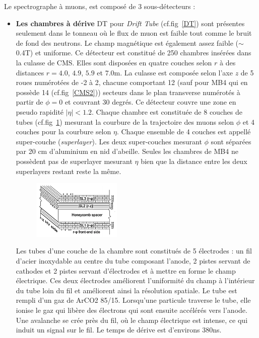 Le spectrographe à muons, est composé de 3 sous-détecteurs :
\begin{itemize}[label=$\bullet$]
	\item \textbf{Les chambres à dérive} DT pour \textit{Drift Tube} (cf.fig~\ref{DT}) sont présentes seulement dans le tonneau où le flux de muon est faible tout comme le bruit de fond des neutrons. Le champ magnétique est également assez faible ($\sim$0.4T) et uniforme. Ce détecteur est constitué de 250 chambres insérées dans la culasse de CMS. Elles sont disposées en quatre couches selon $r$ à des distances $r=4.0$, $4.9$, $5.9$ et $7.0$m. La culasse est composée selon l'axe $z$ de 5 roues numérotées de -2 à 2, chacune comportant 12 (sauf pour MB4 qui en possède 14 (cf.fig~\ref{CMS2})) secteurs dans le plan transverse numérotés à partir de $\phi=0$ et couvrant 30 degrés. Ce détecteur couvre une zone en pseudo rapidité $|\eta|<1.2$. Chaque chambre est constituée de 8 couches de tubes (cf.fig~\ref{DT1}) mesurant la courbure de la trajectoire des muons selon $\phi$ et 4 couches pour la courbure selon $\eta$. Chaque ensemble de 4 couches est appellé super-couche (\textit{superlayer}). Les deux super-couches mesurant $\phi$ sont séparées par 20 cm d'aluminium en nid d'abeille. Seules les chambres de MB4 ne possèdent pas de superlayer mesurant $\eta$ bien que la distance entre les deux superlayers restant reste la même.
	\begin{figure}[ht!]
		\centering
		\includegraphics[width=0.40\textwidth]{CMS/DTchamber.png}
		\label{DT1}
	\end{figure}

    Les tubes d'une couche de la chambre sont constitués de 5 électrodes : un fil d'acier inoxydable au centre du tube composant l'anode, 2 pistes servant de cathodes et 2 pistes servant d'électrodes et à mettre en forme le champ électrique. Ces deux électrodes améliorent l'uniformité du champ à l'intérieur du tube loin du fil et améliorent ainsi la résolution spatiale. Le tube est rempli d'un gaz de ArCO2 85/15. Lorsqu'une particule traverse le tube, elle ionise le gaz qui libère des électrons qui sont ensuite accélérés vers l'anode. Une avalanche se crée près du fil, où le champ électrique est intense, ce qui induit un signal sur le fil. Le temps de dérive est d'environs 380ns. 
    

\end{itemize}
